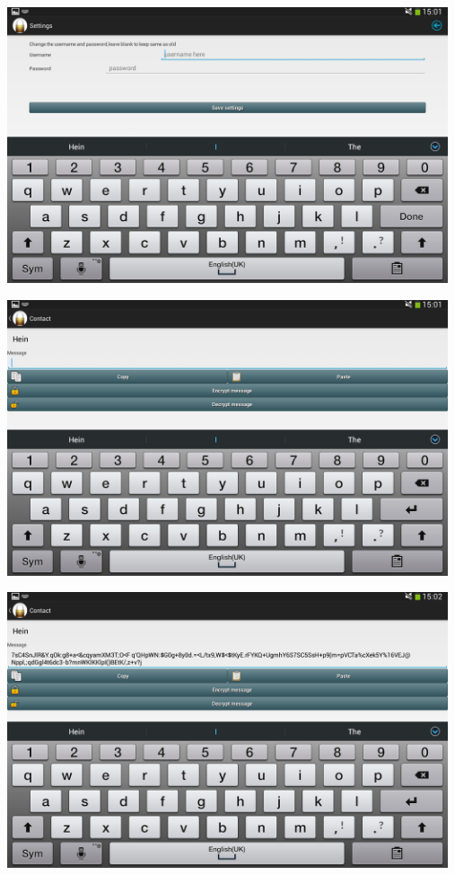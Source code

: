 \begin{center}
 \includegraphics[width=13cm]{screenshots/tablet/5_EditUserAccount.png}
\end{center}
\begin{center}
 \includegraphics[width=13cm]{screenshots/tablet/6_ComposeMessage.png}
\end{center}
\begin{center}
 \includegraphics[width=13cm]{screenshots/tablet/7_MessageEncrypted.png}
\end{center}
